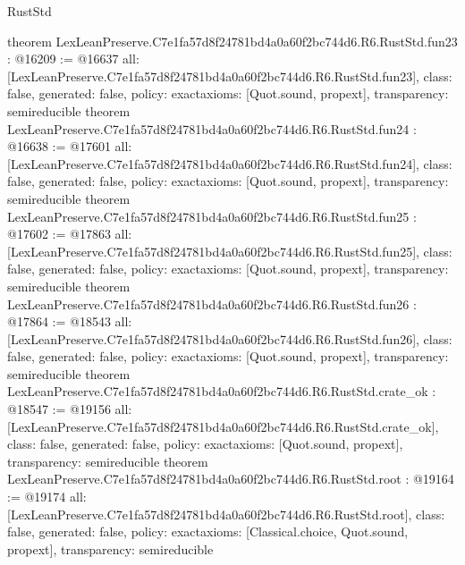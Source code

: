 \begin{lexlean}{RustStd}
\begin{coremodule}
{}
theorem LexLeanPreserve.C7e1fa57d8f24781bd4a0a60f2bc744d6.R6.RustStd.fun23 : @16209 := @16637 {
  all: [LexLeanPreserve.C7e1fa57d8f24781bd4a0a60f2bc744d6.R6.RustStd.fun23],
  class: false,
  generated: false,
  policy: exact{axioms: [Quot.sound, propext]},
  transparency: semireducible
}
theorem LexLeanPreserve.C7e1fa57d8f24781bd4a0a60f2bc744d6.R6.RustStd.fun24 : @16638 := @17601 {
  all: [LexLeanPreserve.C7e1fa57d8f24781bd4a0a60f2bc744d6.R6.RustStd.fun24],
  class: false,
  generated: false,
  policy: exact{axioms: [Quot.sound, propext]},
  transparency: semireducible
}
theorem LexLeanPreserve.C7e1fa57d8f24781bd4a0a60f2bc744d6.R6.RustStd.fun25 : @17602 := @17863 {
  all: [LexLeanPreserve.C7e1fa57d8f24781bd4a0a60f2bc744d6.R6.RustStd.fun25],
  class: false,
  generated: false,
  policy: exact{axioms: [Quot.sound, propext]},
  transparency: semireducible
}
theorem LexLeanPreserve.C7e1fa57d8f24781bd4a0a60f2bc744d6.R6.RustStd.fun26 : @17864 := @18543 {
  all: [LexLeanPreserve.C7e1fa57d8f24781bd4a0a60f2bc744d6.R6.RustStd.fun26],
  class: false,
  generated: false,
  policy: exact{axioms: [Quot.sound, propext]},
  transparency: semireducible
}
theorem LexLeanPreserve.C7e1fa57d8f24781bd4a0a60f2bc744d6.R6.RustStd.crate_ok : @18547 := @19156 {
  all: [LexLeanPreserve.C7e1fa57d8f24781bd4a0a60f2bc744d6.R6.RustStd.crate_ok],
  class: false,
  generated: false,
  policy: exact{axioms: [Quot.sound, propext]},
  transparency: semireducible
}
theorem LexLeanPreserve.C7e1fa57d8f24781bd4a0a60f2bc744d6.R6.RustStd.root : @19164 := @19174 {
  all: [LexLeanPreserve.C7e1fa57d8f24781bd4a0a60f2bc744d6.R6.RustStd.root],
  class: false,
  generated: false,
  policy: exact{axioms: [Classical.choice, Quot.sound, propext]},
  transparency: semireducible
}


\end{coremodule}
\end{lexlean}
